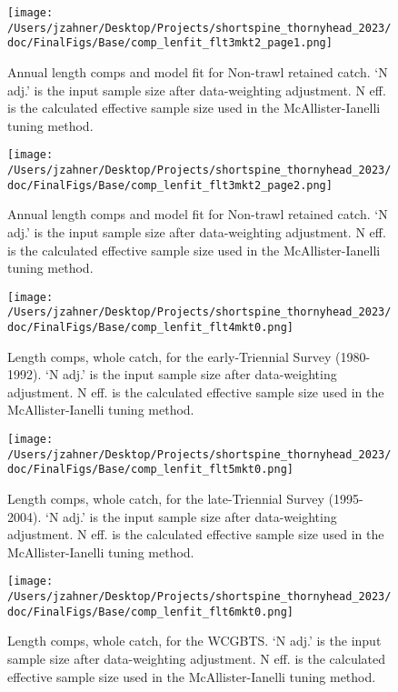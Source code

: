 \documentclass[11pt,
  english,
  letterpaper,
]{article}
\begin{document}
\begin{figure}
\centering
\texttt{[image: /Users/jzahner/Desktop/Projects/shortspine\_thornyhead\_2023/doc/FinalFigs/Base/comp\_lenfit\_flt3mkt2\_page1.png]}
\caption{Annual length comps and model fit for Non-trawl retained catch. `N adj.' is the input sample size after data-weighting adjustment. N eff. is the calculated effective sample size used in the McAllister-Ianelli tuning method.\label{fig:nontrawl_comps_1}}
\end{figure}

\begin{figure}
\centering
\texttt{[image: /Users/jzahner/Desktop/Projects/shortspine\_thornyhead\_2023/doc/FinalFigs/Base/comp\_lenfit\_flt3mkt2\_page2.png]}
\caption{Annual length comps and model fit for Non-trawl retained catch. `N adj.' is the input sample size after data-weighting adjustment. N eff. is the calculated effective sample size used in the McAllister-Ianelli tuning method.\label{fig:nontrawl_comps_2}}
\end{figure}

\begin{figure}
\centering
\texttt{[image: /Users/jzahner/Desktop/Projects/shortspine\_thornyhead\_2023/doc/FinalFigs/Base/comp\_lenfit\_flt4mkt0.png]}
\caption{Length comps, whole catch, for the early-Triennial Survey (1980-1992). `N adj.' is the input sample size after data-weighting adjustment. N eff. is the calculated effective sample size used in the McAllister-Ianelli tuning method.\label{fig:fits_etri}}
\end{figure}

\begin{figure}
\centering
\texttt{[image: /Users/jzahner/Desktop/Projects/shortspine\_thornyhead\_2023/doc/FinalFigs/Base/comp\_lenfit\_flt5mkt0.png]}
\caption{Length comps, whole catch, for the late-Triennial Survey (1995-2004). `N adj.' is the input sample size after data-weighting adjustment. N eff. is the calculated effective sample size used in the McAllister-Ianelli tuning method.\label{fig:fits_ltri}}
\end{figure}

\begin{figure}
\centering
\texttt{[image: /Users/jzahner/Desktop/Projects/shortspine\_thornyhead\_2023/doc/FinalFigs/Base/comp\_lenfit\_flt6mkt0.png]}
\caption{Length comps, whole catch, for the WCGBTS. `N adj.' is the input sample size after data-weighting adjustment. N eff. is the calculated effective sample size used in the McAllister-Ianelli tuning method.\label{fig:fits_wcgbts}}
\end{figure}
\end{document}
